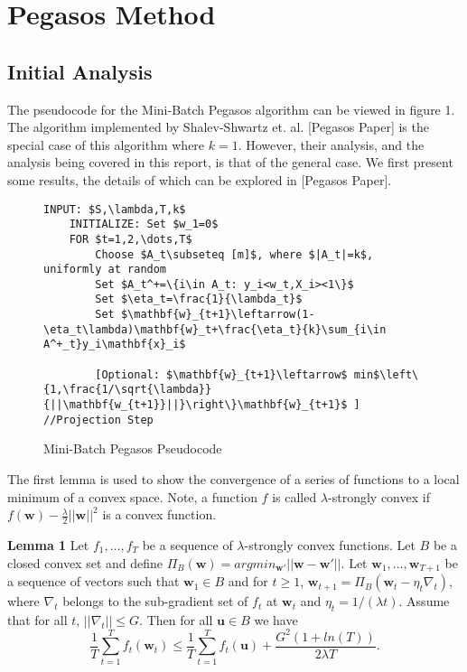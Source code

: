 \documentclass{article}
\begin{document}
\section{Pegasos Method}
\subsection{Initial Analysis}
The pseudocode for the Mini-Batch Pegasos algorithm can be viewed in figure 1. The algorithm implemented by
Shalev-Shwartz et. al. [Pegasos Paper] is the special case of this algorithm where $k=1$. However, their
analysis, and the analysis being covered in this report, is that of the general case. We first present some
results, the details of which can be explored in [Pegasos Paper].

\begin{figure}[h]
	\centering
    \begin{lstlisting}[frame=single, mathescape=true]
    INPUT: $S,\lambda,T,k$
    INITIALIZE: Set $w_1=0$
    FOR $t=1,2,\dots,T$
    	Choose $A_t\subseteq [m]$, where $|A_t|=k$, uniformly at random
        Set $A_t^+=\{i\in A_t: y_i<w_t,X_i><1\}$
        Set $\eta_t=\frac{1}{\lambda_t}$
        Set $\mathbf{w}_{t+1}\leftarrow(1-\eta_t\lambda)\mathbf{w}_t+\frac{\eta_t}{k}\sum_{i\in A^+_t}y_i\mathbf{x}_i$
        
        [Optional: $\mathbf{w}_{t+1}\leftarrow$ min$\left\{1,\frac{1/\sqrt{\lambda}}{||\mathbf{w_{t+1}}||}\right\}\mathbf{w}_{t+1}$ ] //Projection Step
    \end{lstlisting}
    \caption{Mini-Batch Pegasos Pseudocode}
\end{figure}


The first lemma is used to show the convergence of a series of functions to a local minimum of a convex
space.
Note, a function $f$ is called $\lambda$-strongly convex if $f(\mathbf{w})-\frac{\lambda}{2}||\mathbf{w}||^2$
is a convex function.

\textbf{Lemma 1} Let $f_1,\dots,f_T$ be a sequence of $\lambda$-strongly convex functions. Let $B$ be a closed
convex set and define $\Pi_B(\mathbf{w})=argmin_{\mathbf{w'}}||\mathbf{w}-\mathbf{w}'||$. Let
$\mathbf{w}_1,\dots,\mathbf{w}_{T+1}$ be a sequence of vectors such that $\mathbf{w}_1\in B$ and
for $t\geq 1$, $\mathbf{w}_{t+1}=\Pi_B(\mathbf{w}_t-\eta_t\nabla_t)$, where $\nabla_t$ belongs
to the sub-gradient set of $f_t$ at $\mathbf{w}_t$ and $\eta_t=1/(\lambda t)$. Assume that for all $t$,
$||\nabla_t||\leq G$. Then for all $\mathbf{u}\in B$ we have
$$\frac{1}{T}\sum_{t=1}^Tf_t(\mathbf{w}_t)\leq \frac{1}{T}\sum_{t=1}^Tf_t(\mathbf{u})+\frac{G^2(1+ln(T))}{2\lambda T}.$$
\end{document}
